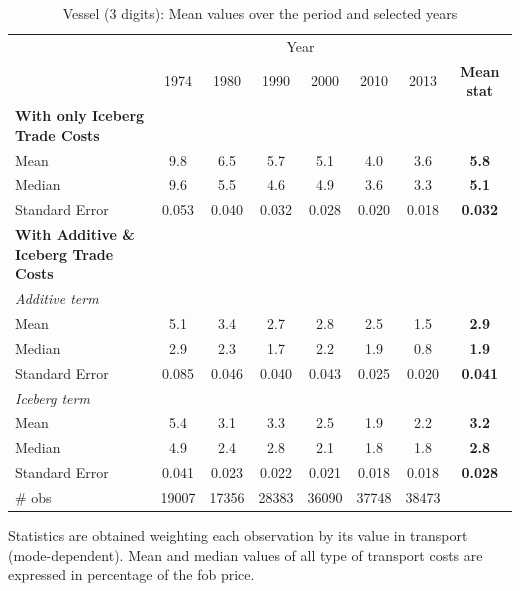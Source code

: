 \documentclass[a4paper,11pt]{article}
\begin{document}
\begin{table}[htbp]
  \centering
  \caption{Vessel (3 digits): Mean values over the period and selected years}
\begin{center}
    \begin{tabular}{lccccccc}

   \hline\hline
          & \multicolumn{6}{c}{Year}                      &  \\

          & 1974  & 1980  & 1990  & 2000  & 2010  & 2013  & \multicolumn{1}{c}{\textbf{Mean stat}} \\
 \hline
   \textbf{With only Iceberg Trade Costs} &       &       &       &       &       &       & \textbf{} \\
Mean  & 9.8 & 6.5 & 5.7 &5.1 & 4.0 & 3.6 & \textbf{5.8} \\
Median & 9.6 & 5.5 & 4.6 & 4.9 & 3.6 & 3.3 & \textbf{5.1} \\
Standard Error & 0.053 & 0.040 & 0.032 & 0.028 & 0.020 & 0.018 & \textbf{0.032} \\
\textbf{With Additive \& Iceberg Trade Costs} &       &       &       &       &       &       & \textbf{} \\
\hline
\textit{Additive term } &       &       &       &       &       &       & \textbf{} \\
Mean  & 5.1 & 3.4 & 2.7 & 2.8 & 2.5 & 1.5 & \textbf{2.9} \\
Median & 2.9 & 2.3 & 1.7 & 2.2 & 1.9 & 0.8 & \textbf{1.9} \\
Standard Error & 0.085 & 0.046 & 0.040 & 0.043 & 0.025 & 0.020 & \textbf{0.041} \\
\textit{Iceberg term} &       &       &       &       &       &       & \textbf{} \\
Mean  & 5.4 & 3.1 & 3.3 & 2.5 & 1.9 & 2.2 & \textbf{3.2} \\
Median & 4.9 & 2.4 & 2.8 & 2.1 & 1.8 & 1.8 & \textbf{2.8} \\
Standard Error & 0.041 & 0.023 & 0.022 & 0.021 & 0.018 & 0.018 & \textbf{0.028} \\
\hline
\# obs & 19007 & 17356 & 28383 & 36090 & 37748 & 38473 & \textbf{} \\
\hline\hline
    \end{tabular}%
  \end{center}
  \label{tab:result_ves}%
\tiny{Statistics are obtained weighting each observation by its value in transport (mode-dependent). Mean and median values of all type of transport costs are expressed in percentage of the fob price.}
\end{table}%
\end{document}
